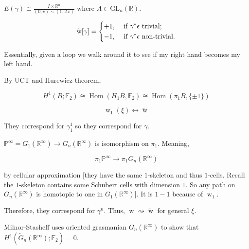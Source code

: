 \documentclass{article}
\theoremstyle{definition}
\begin{document}
    \(E(\gamma) \cong \frac{I \times \mathbb{R}^n}{(0,v) \sim (1,Av)}\) where \(A\in \text{GL}_n(\mathbb{R})\).

    \[
        \widetilde{\operatorname{w}} [\gamma] = \begin{dcases}
            +1, &\text{ if } \gamma ^{\ast} \epsilon \text{ trivial}  ;\\
            -1, &\text{ if } \gamma^{\ast} \epsilon \text{ non-trivial}.
        \end{dcases}
    \]

    Essentially, given a loop we walk around it to see if my right hand becomes my left hand.

    By UCT and Hurewicz theorem,

    \[
        H^1(B;\mathbb{F}_2) \cong \operatorname{Hom} (H_1 B, \mathbb{F}_2) \cong \operatorname{Hom} (\pi_1 B, \{ \pm 1 \})
    \]

    \[
        \operatorname{w}_1(\xi) \longleftrightarrow \widetilde{\operatorname{w}} 
    \]

    They correspond for \(\gamma^1_1\) so they correspond for \(\gamma\).

    \(\mathbb{P}^{\infty} = G_1(\mathbb{R}^{\infty}) \to G_n(\mathbb{R}^{\infty})\) is isomorphism on \(\pi_1\). Meaning,

    \[
        \pi_1 \mathbb{P}^{\infty} \to \pi_1 G_n (\mathbb{R}^{\infty})
    \]

    by cellular approximation [they have the same \(1\)-skeleton and thus \(1\)-cells. Recall the \(1\)-skeleton contains some Schubert cells with dimension \(1\). So any path on \(G_n(\mathbb{R}^{\infty})\) is homotopic to one in \(G_1(\mathbb{R}^{\infty})\)]. It is \(1-1\) because of \(\operatorname{w}_1\).

    Therefore, they correspond for \(\gamma^n\). Thus, \(\operatorname{w} \rightsquigarrow \widetilde{\operatorname{w}}\) for general \(\xi\).

    Milnor-Stasheff uses oriented grasmanian \(\widetilde{G}_n(\mathbb{R}^{\infty})\) to show that \(H^1(\widetilde{G}_n(\mathbb{R}^{\infty});\mathbb{F}_2) = 0\). 
\end{document}
